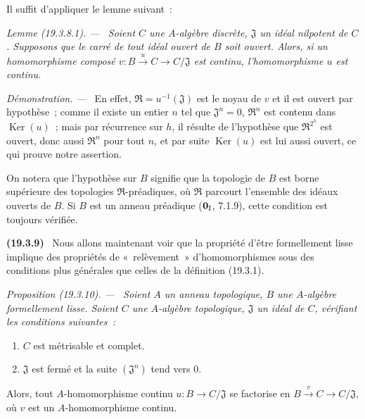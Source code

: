 \documentclass[10pt,oneside]{book}
\makeatletter
\newcommand{\setmanualcurrentlabel}[1]{\def\@currentlabel{#1}}
\newcommand{\oldpage}[2][]{%
  \setcounter{footnote}{0}%
  \marginpar{\scriptsize\textbf{#1}~|~#2}\ignorespaces}
\newenvironment{env}[1][]{\setmanualcurrentlabel{#1}\par\medskip\noindent\textbf{(#1)}\ }{\par}
\newenvironment{proposition}[1][]{%
  \setmanualcurrentlabel{#1}\par\medskip\noindent\itshape Proposition (#1). ---\ }{\par}
\newenvironment{lemma}[1][]{%
  \setmanualcurrentlabel{#1}\par\medskip\noindent\itshape Lemme (#1). ---\ }{\par}
\newenvironment{proof}{%
  \par\medskip\noindent\textit{Démonstration. ---\ }}{\par}
\makeatother
\begin{document}
Il suffit d'appliquer le lemme suivant~:

\begin{lemma}[19.3.8.1]
\label{0.19.3.8.1-fr}
Soient $C$ une $A$-algèbre discrète, $\mathfrak J$ un idéal nilpotent de $C$.
Supposons que le carré de tout idéal ouvert de $B$ soit ouvert. Alors, si un
homomorphisme composé
$v:B\xrightarrow{u}C\to C/\mathfrak J$ est continu, l'homomorphisme $u$
est continu.
\end{lemma}

\begin{proof}
En effet, $\mathfrak R=u^{-1}(\mathfrak J)$ est le noyau de $v$ et il est
ouvert par hypothèse~; comme il existe un entier $n$ tel que
$\mathfrak J^n=0$, $\mathfrak R^n$ est contenu dans
$\operatorname{Ker}(u)$~; mais par récurrence sur $h$, il résulte de
l'hypothèse que $\mathfrak R^{2^h}$ est ouvert, donc aussi
$\mathfrak R^n$ pour tout $n$, et par suite $\operatorname{Ker}(u)$ est lui
aussi ouvert, ce qui prouve notre assertion.
\end{proof}

On notera que l'hypothèse sur $B$ signifie que la topologie de $B$ est borne
supérieure des topologies $\mathfrak R$-préadiques, où $\mathfrak R$ parcourt
l'ensemble des idéaux ouverts de $B$. Si $B$ est un anneau préadique
($\mathbf 0_{\rm I}$, 7.1.9), cette condition est toujours vérifiée.

\begin{env}[19.3.9]
\label{0.19.3.9-fr}
Nous allons maintenant voir que la propriété d'être formellement lisse
implique des propriétés de «~relèvement~» d'homomorphismes sous des conditions
plus générales que celles de la définition (19.3.1).
\end{env}

\oldpage[0\textsubscript{IV-1}]{84}

\begin{proposition}[19.3.10]
\label{0.19.3.10-fr}
Soient $A$ un anneau topologique, $B$ une $A$-algèbre formellement lisse.
Soient $C$ une $A$-algèbre topologique, $\mathfrak J$ un idéal de $C$,
vérifiant les conditions suivantes~:
\begin{enumerate}
  \item[$1^\circ$] $C$ est métrisable et complet.
  \item[$2^\circ$] $\mathfrak J$ est fermé et la suite
  $(\mathfrak J^n)$ tend vers $0$.
\end{enumerate}
Alors, tout $A$-homomorphisme continu $u:B\to C/\mathfrak J$ se factorise en
$B\xrightarrow{v}C\to C/\mathfrak J$, où $v$ est un
$A$-homomorphisme continu.
\end{proposition}
\end{document}
